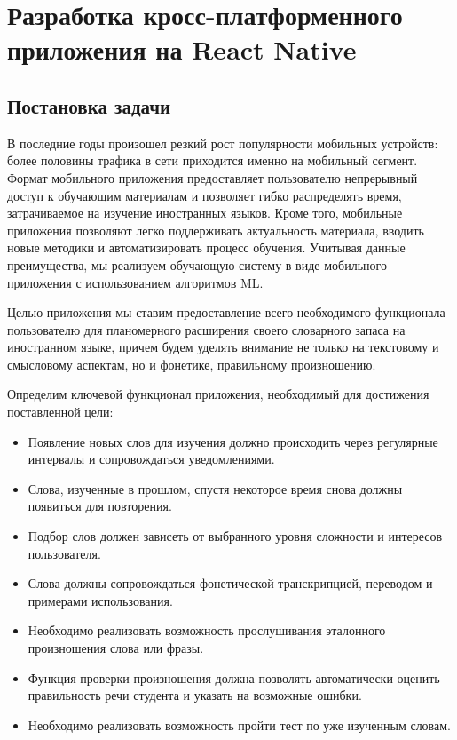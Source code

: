 \section{Разработка кросс-платформенного приложения на React Native}
\label{sec:section-2}

\subsection{Постановка задачи}
В последние годы произошел резкий рост популярности мобильных устройств: более половины трафика в сети приходится именно на мобильный сегмент\cite{mobile-traffic-stats}. Формат мобильного приложения предоставляет пользователю непрерывный доступ к обучающим материалам и позволяет гибко распределять время, затрачиваемое на изучение иностранных языков. Кроме того, мобильные приложения позволяют легко поддерживать актуальность материала, вводить новые методики и автоматизировать процесс обучения. Учитывая данные преимущества, мы реализуем обучающую систему в виде мобильного приложения с использованием алгоритмов ML.

Целью приложения мы ставим предоставление всего необходимого функционала пользователю для планомерного расширения своего словарного запаса на иностранном языке, причем будем уделять внимание не только на текстовому и смысловому аспектам, но и фонетике, правильному произношению.

Определим ключевой функционал приложения, необходимый для достижения поставленной цели:
\begin{itemize}
	\item Появление новых слов для изучения должно происходить через регулярные интервалы и сопровождаться уведомлениями.
	\item Слова, изученные в прошлом, спустя некоторое время снова должны появиться для повторения.
	\item Подбор слов должен зависеть от выбранного уровня сложности и интересов пользователя.
	\item Слова должны сопровождаться фонетической транскрипцией, переводом и примерами использования.
	\item Необходимо реализовать возможность прослушивания эталонного произношения слова или фразы.
	\item Функция проверки произношения должна позволять автоматически оценить правильность речи студента и указать на возможные ошибки.
	\item Необходимо реализовать возможность пройти тест по уже изученным словам.
\end{itemize}

